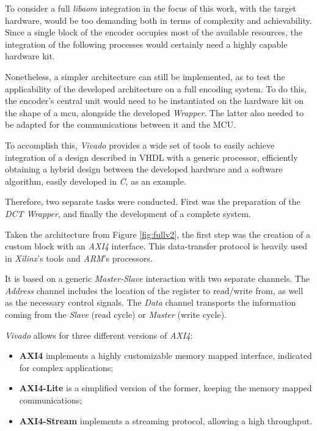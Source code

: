 To consider a full \emph{libaom} integration in the focus of this work, with the target hardware, would be too demanding both in terms of complexity and achievability. Since a single block of the encoder occupies most of the available resources, the integration of the following processes would certainly need a highly capable hardware kit. 

Nonetheless, a simpler architecture can still be implemented, as to test the applicability of the developed architecture on a full encoding system. To do this, the encoder's central unit would need to be instantiated on the hardware kit on the shape of a \gls{mcu}, alongside the developed \emph{Wrapper}. The latter also needed to be adapted for the communications between it and the MCU.

To accomplish this, \emph{Vivado} provides a wide set of tools to easily achieve integration of a design described in VHDL with a generic processor, efficiently obtaining a hybrid design between the developed hardware and a software algorithm, easily developed in \emph{C}, as an example.

Therefore, two separate tasks were conducted. First was the preparation of the \emph{DCT Wrapper}, and finally the development of a complete system.


Taken the architecture from Figure \ref{fig:fullv2}, the first step was the creation of a custom block with an \emph{AXI4} interface. This data-transfer protocol is heavily used in \emph{Xilinx}'s tools and \emph{ARM}'s processors.

It is based on a generic \emph{Master-Slave} interaction with two separate channels. The \emph{Address} channel includes the location of the register to read/write from, as well as the necessary control signals. The \emph{Data} channel transports the information coming from the \emph{Slave} (read cycle) or \emph{Master} (write cycle). 

\emph{Vivado} allows for three different versions of \emph{AXI4}:

\begin{itemize}
    \item \textbf{AXI4} implements a highly customizable memory mapped interface, indicated for complex applications;
    \item \textbf{AXI4-Lite} is a simplified version of the former, keeping the memory mapped communications;
    \item \textbf{AXI4-Stream} implements a streaming protocol, allowing a high throughput.
\end{itemize}

